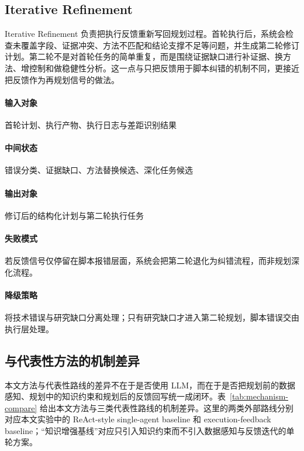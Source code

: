 \subsection{Iterative Refinement}

Iterative Refinement 负责把执行反馈重新写回规划过程。首轮执行后，系统会检查未覆盖字段、证据冲突、方法不匹配和结论支撑不足等问题，并生成第二轮修订计划。第二轮不是对首轮任务的简单重复，而是围绕证据缺口进行补证据、换方法、增控制和做稳健性分析。这一点与只把反馈用于脚本纠错的机制不同，更接近把反馈作为再规划信号的做法\citep{shinn2024reflexion,zhou2024hypothesis}。

\paragraph{输入对象}
首轮计划、执行产物、执行日志与差距识别结果

\paragraph{中间状态}
错误分类、证据缺口、方法替换候选、深化任务候选

\paragraph{输出对象}
修订后的结构化计划与第二轮执行任务

\paragraph{失败模式}
若反馈信号仅停留在脚本报错层面，系统会把第二轮退化为纠错流程，而非规划深化流程。

\paragraph{降级策略}
将技术错误与研究缺口分离处理；只有研究缺口才进入第二轮规划，脚本错误交由执行层处理。

\subsection{与代表性方法的机制差异}

本文方法与代表性路线的差异不在于是否使用 LLM，而在于是否把规划前的数据感知、规划中的知识约束和规划后的反馈回写统一成闭环。表~\ref{tab:mechanism-compare} 给出本文方法与三类代表性路线的机制差异。这里的两类外部路线分别对应本文实验中的 ReAct-style single-agent baseline 和 execution-feedback baseline；“知识增强基线”对应只引入知识约束而不引入数据感知与反馈迭代的单轮方案。

